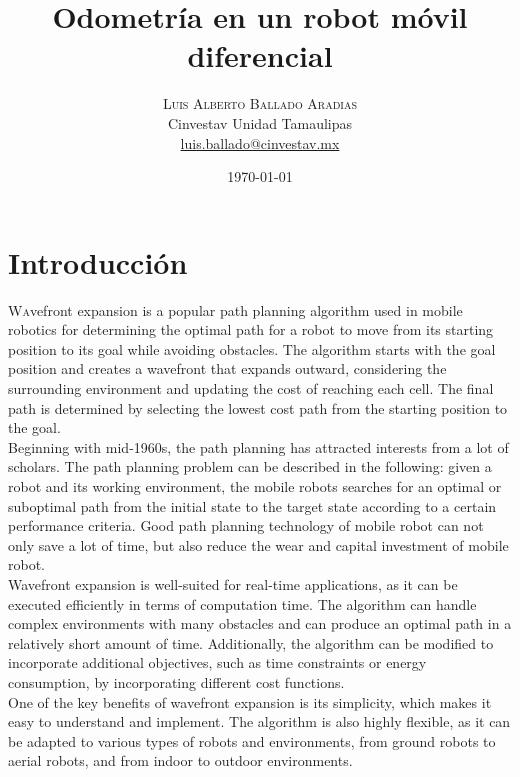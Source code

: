 \documentclass[oneside,twocolumn]{article}
\title{Odometría en un robot móvil diferencial} %
\author{%
\textsc{Luis Alberto Ballado Aradias} \\%
\normalsize Cinvestav Unidad Tamaulipas \\ %
\normalsize \href{mailto:luis.ballado@cinvestav.mx}{luis.ballado@cinvestav.mx} %
}
\date{\today} %
\begin{document}
\maketitle



    
\section{Introducción}

\lettrine[nindent=0em,lines=3]{W} avefront expansion is a popular path planning algorithm used in mobile robotics for determining the optimal path for a robot to move from its starting position to its goal while avoiding obstacles. The algorithm starts with the goal position and creates a wavefront that expands outward, considering the surrounding environment and updating the cost of reaching each cell. The final path is determined by selecting the lowest cost path from the starting position to the goal.\\

Beginning with mid-1960s, the path planning has attracted interests from a lot of scholars. The path planning problem can be described in the following: given a robot and its working environment, the mobile robots searches for an optimal or suboptimal path from the initial state to the target state according to a certain performance criteria. Good path planning technology of mobile robot can not only save a lot of time, but also reduce the wear and capital investment of mobile robot.\\

Wavefront expansion is well-suited for real-time applications, as it can be executed efficiently in terms of computation time. The algorithm can handle complex environments with many obstacles and can produce an optimal path in a relatively short amount of time. Additionally, the algorithm can be modified to incorporate additional objectives, such as time constraints or energy consumption, by incorporating different cost functions.\\

One of the key benefits of wavefront expansion is its simplicity, which makes it easy to understand and implement. The algorithm is also highly flexible, as it can be adapted to various types of robots and environments, from ground robots to aerial robots, and from indoor to outdoor environments. \\
\end{document}
